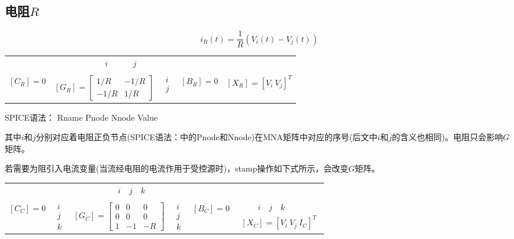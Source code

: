 \documentclass[12pt]{article}
\begin{document}
\subsection{电阻$R$} \label{subsec:2.1}
\begin{equation*}
  i_R(t)=\frac{1}{R}\left(V_i(t)-V_j(t)\right)
\end{equation*}
\begin{table}[H]
  \centering
  \renewcommand\arraystretch{0.5}
  \begin{tabular}{ccccc}
    & $ \qquad \qquad i \qquad \quad  j$ & & & \\                            \\
  $\left[C_R\right]=0$ & 
  $\left[G_R\right]= \left[\begin{array}{cc} 1 / R & -1 / R \\ -1 / R & 1 / R \end{array}\right]$  & 
  $\begin{array}{c} i \\ j \end{array}$ & 
  $\left[B_R\right]=0$ & 
  $\left[X_R\right]=\left[ V_i \ V_j \right]^T$ \\
  \end{tabular}
\end{table}
\qquad SPICE语法： Rname Pnode Nnode Value\par
\qquad 其中$i$和$j$分别对应着电阻正负节点(SPICE语法：中的Pnode和Nnode)在MNA矩阵中对应的序号(后文中$i$和$j$的含义也相同)。电阻只会影响$G$矩阵。\par
\qquad 若需要为阻引入电流变量(当流经电阻的电流作用于受控源时)，stamp操作如下式所示，会改变$G$矩阵。\par
\begin{table}[H]
  \centering
  \renewcommand\arraystretch{0.5}
  \begin{tabular}{cccccc}
   & & $ \qquad \quad i \quad j \quad k$ & & & \\                            \\
  $\left[C_C\right]=0$  & 
  $\begin{array}{c} i \\ j \\ k \end{array}$& 
  $\left[G_C\right]=\left[\begin{array}{ccc} 0 & 0 & 0\\ 0 & 0 & 0\\ 1 & -1 & -R \end{array}\right]$  & 
  $\begin{array}{c} i \\ j \\ k \end{array}$ & 
  $\left[B_C\right]=0$ & 
  $\begin{array}{c} \qquad i \quad j \quad k \\ \left[X_C\right]=\left[ V_i \ V_j \ I_C \right]^T\end{array}$ \\
  \end{tabular}
\end{table}
\end{document}
